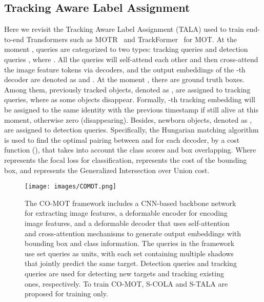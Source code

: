 \documentclass{article}
\begin{document}
\subsection{Tracking Aware Label Assignment}





Here we revisit the Tracking Aware Label Assignment (TALA) used to train end-to-end Transformers such as MOTR~\cite{zeng2022motr} and TrackFormer~\cite{meinhardt2022trackformer} for MOT. At the moment ,  queries are categorized to two types:  tracking queries  and  detection queries , where . All the queries will self-attend each other and then cross-attend the image feature tokens via  decoders, and the output embeddings of the -th decoder are denoted as  and . At the moment , there are  ground truth boxes. Among them,  previously tracked objects, denoted as , are assigned to  tracking queries, where  as some objects disappear. Formally, -th tracking embedding  will be assigned to the same identity with the previous timestamp if still alive at this moment, otherwise zero (disappearing). Besides,  newborn objects, denoted as , are assigned to  detection queries. Specifically, the Hungarian matching algorithm is used to find the optimal pairing between  and  for each decoder, by a cost function (), that takes into account the class scores and box overlapping. Where  represents the focal loss for classification,  represents the  cost of the bounding box, and  represents the Generalized Intersection over Union cost. 











\begin{figure*}[t] \centering \texttt{[image: images/COMOT.png]} \caption{The CO-MOT framework includes a CNN-based backbone network for extracting image features, a deformable encoder for encoding image features, and a deformable decoder that uses self-attention and cross-attention mechanisms to generate output embeddings with bounding box and class information. The queries in the framework use set queries as units, with each set containing multiple shadows that jointly predict the same target. Detection queries and tracking queries are used for detecting new targets and tracking existing ones, respectively. To train CO-MOT, S-COLA and S-TALA are proposed for training only.} \label{Fig.main2} \end{figure*}
\end{document}

